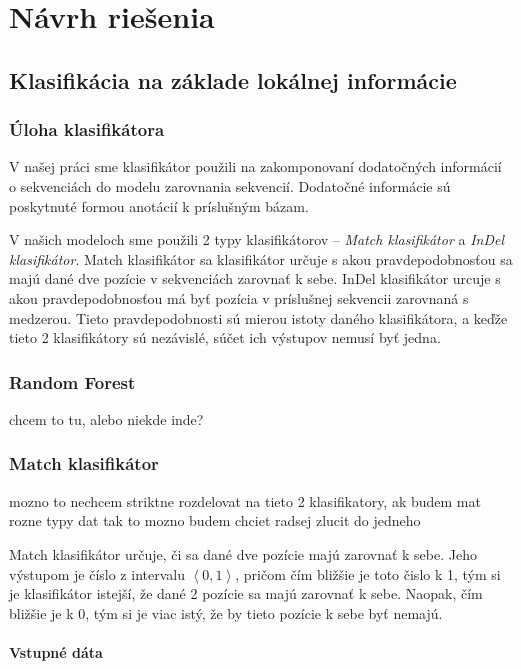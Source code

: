 \chapter{Návrh riešenia}
\section[Klasifikácia]{Klasifikácia na základe lokálnej informácie}

\subsection{Úloha klasifikátora}

V našej práci sme klasifikátor použili na zakomponovaní dodatočných informácií o sekvenciách do modelu zarovnania sekvencií. Dodatočné informácie sú poskytnuté formou anotácií k príslušným bázam.

V našich modeloch sme použili 2 typy klasifikátorov -- \textit{Match klasifikátor} a \textit{InDel klasifikátor}. Match klasifikátor sa klasifikátor určuje s akou pravdepodobnosťou sa majú dané dve pozície v sekvenciách zarovnať k sebe. InDel klasifikátor urcuje s akou pravdepodobnosťou má byť pozícia v príslušnej sekvencii zarovnaná s medzerou. Tieto pravdepodobnosti sú mierou istoty daného klasifikátora, a keďže tieto 2 klasifikátory sú nezávislé, súčet ich výstupov nemusí byť jedna.

\subsection{Random Forest}

\todo chcem to tu, alebo niekde inde?

\todo

\subsection{Match klasifikátor}
\todo mozno to nechcem striktne rozdelovat na tieto 2 klasifikatory, ak budem mat rozne typy dat tak to mozno budem chciet radsej zlucit do jedneho

Match klasifikátor určuje, či sa dané dve pozície majú zarovnať k sebe. Jeho výstupom je číslo z intervalu $\left<0,1\right>$, pričom čím bližšie je toto čislo k 1, tým si je klasifikátor istejší, že dané 2 pozície sa majú zarovnať k sebe. Naopak, čím bližšie je k 0, tým si je viac istý, že by tieto pozície k sebe byť nemajú.

\subsubsection{Vstupné dáta}

